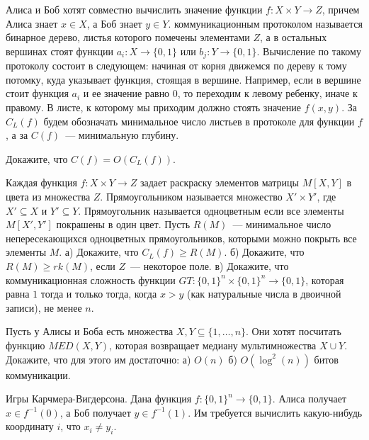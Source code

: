\setcounter{curtask}{15}



Алиса и Боб хотят совместно вычислить значение функции $f: X \times Y \rightarrow Z$, причем Алиса знает $x \in X$, а Боб знает $y
\in Y$. коммуникационным протоколом называется бинарное дерево, листья которого помечены элементами $Z$, а в остальных вершинах
стоят функции $a_i: X \rightarrow \{0, 1\}$ или $b_j: Y \rightarrow \{0, 1\}$. Вычисление по такому протоколу состоит в следующем:
начиная от корня движемся по дереву к тому потомку, куда указывает функция, стоящая в вершине. Например, если в вершине стоит
функция $a_i$ и ее значение равно $0$, то переходим к левому ребенку, иначе к правому. В листе, к которому мы приходим должно
стоять значение $f(x, y)$. За $C_L(f)$ будем обозначать минимальное число листьев в протоколе для функции $f$, а за $C(f)$~---
минимальную глубину.


\begin{task}
    Докажите, что $C(f) = O(C_L(f))$.
\end{task}

\begin{task}
    Каждая функция $f: X \times Y \rightarrow Z$ задает раскраску элементов матрицы $M[X, Y]$ в цвета из множества
    $Z$. Прямоугольником называется множество $X' \times Y'$, где $X' \subseteq X$ и $Y' \subseteq Y$. Прямоугольник называется
    одноцветным если все элементы $M[X', Y']$ покрашены в один цвет. Пусть $R(M)$~--- минимальное число непересекающихся одноцветных
    прямоугольников, которыми можно покрыть все элементы $M$.
    а) Докажите, что $C_L(f) \ge R(M)$. б) Докажите, что $R(M) \ge rk(M)$, если $Z$~--- некоторое поле.
    в) Докажите, что коммуникационная сложность функции $GT: \{0, 1\}^n \times \{0, 1\}^n \rightarrow \{0, 1\}$, которая равна $1$
    тогда и только тогда, когда $x > y$ (как натуральные числа в двоичной записи), не менее $n$.
\end{task}

\begin{task}
    Пусть у Алисы и Боба есть множества $X, Y \subseteq \{1, \dots, n\}$. Они хотят посчитать функцию $MED(X, Y)$, которая
    возвращает медиану мультимножества $X \cup Y$. Докажите, что для этого им достаточно: а) $O(n)$ б) $O(\log^2(n))$ битов коммуникации.
\end{task}



Игры Карчмера-Вигдерсона. Дана функция $f: \{0, 1\}^n \rightarrow \{0, 1\}$. Алиса получает $x \in f^{-1}(0)$, а Боб получает $y
\in f^{-1}(1)$. Им требуется вычислить какую-нибудь координату $i$, что $x_i \neq y_i$.

